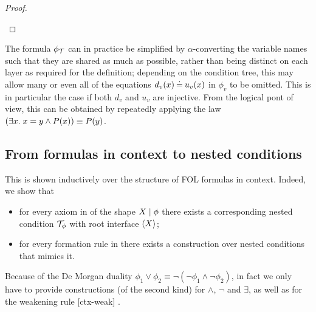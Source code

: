 \begin{proof}
\begin{description}


\end{description}
\end{proof}
%
The formula $\phi_{\mathcal{T}}$ can in practice be simplified by $\alpha$-converting the variable names such that they are shared as much as possible, rather than being distinct on each layer as required for the definition; depending on the condition tree, this may allow many or even all of the equations $d_v(x)\mathbin{\doteq} u_v(x)$ in $\phi_v$ to be omitted. This is in particular the case if both $d_v$ and $u_v$ are injective. From the logical pont of view, this can be obtained by repeatedly applying the law $\left( \exists x .\; x = y \wedge P(x)\right) \equiv P(y)$.

\subsection{From formulas in context to nested conditions}


This is shown inductively over the structure of FOL formulas in context. Indeed, we show that 
\begin{itemize}
\item for every axiom in  of the shape ${X} \mid {\phi}$ there exists a corresponding {\proper} nested condition ${\mathcal{T}}_\phi$ with root interface $\langle X\rangle$;
\item for every formation rule in  there exists a construction over {\proper} nested conditions that mimics it.
\end{itemize}
%
%
Because of the De Morgan duality $\phi_1\vee \phi_2 \equiv \neg(\neg\phi_1\wedge \neg\phi_2)$, in fact we only have to provide constructions (of the second kind) for $\wedge$, $\neg$ and $\exists$, as well as for the weakening rule [ctx-weak] .


